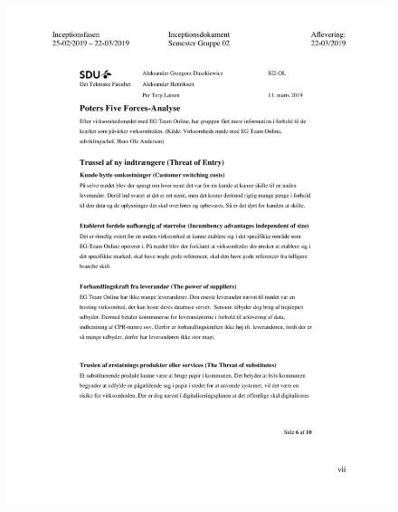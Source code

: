 \begin{figure}[hb]
  \includegraphics[scale = 0.33]{./PNG/Inceptions/Gruppe 02 + InceptionsDokument-40.jpg} 
\end{figure}

